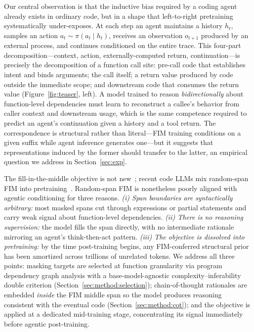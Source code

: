 Our central observation is that the inductive bias required by a coding
agent already exists in ordinary code, but in a shape that left-to-right
pretraining systematically under-exposes. At each step an agent maintains a
history $h_t$, samples an action $a_t \sim \pi(a_t \mid h_t)$, receives an
observation $o_{t+1}$ produced by an external process, and continues
conditioned on the entire trace. This four-part decomposition---context,
action, externally-computed return, continuation---is precisely the
decomposition of a function call site: pre-call code that establishes intent
and binds arguments; the call itself; a return value produced by code
outside the immediate scope; and downstream code that consumes the return
value (Figure~\ref{fig:teaser}, left). A model trained to reason
\emph{bidirectionally} about function-level dependencies must learn to
reconstruct a callee's behavior from caller context and downstream usage,
which is the same competence required to predict an agent's continuation
given a history and a tool return. The correspondence is structural rather
than literal---FIM training conditions on a given suffix while agent
inference generates one---but it suggests that representations induced by
the former should transfer to the latter, an empirical question we address
in Section~\ref{sec:exp}.

The fill-in-the-middle objective is not new~\citep{bavarian2022fim};
recent code LLMs mix random-span FIM into pretraining~\citep{qwencoder,
deepseekcoder, starcoder}. Random-span FIM is nonetheless poorly aligned
with agentic conditioning for three reasons. \emph{(i) Span boundaries
are syntactically arbitrary:} most masked spans cut through expressions
or partial statements and carry weak signal about function-level
dependencies. \emph{(ii) There is no reasoning supervision:} the model
fills the span directly, with no intermediate rationale mirroring an
agent's think-then-act pattern. \emph{(iii) The objective is dissolved
into pretraining:} by the time post-training begins, any FIM-conferred
structural prior has been amortized across trillions of unrelated tokens.
We address all three points: masking targets are selected at function
granularity via program dependency graph analysis with a
base-model-agnostic complexity--inferability double criterion
(Section~\ref{sec:method:selection}); chain-of-thought rationales are
embedded \emph{inside} the FIM middle span so the model produces
reasoning consistent with the eventual code
(Section~\ref{sec:method:cot}); and the objective is applied at a
dedicated mid-training stage, concentrating its signal immediately before
agentic post-training.

